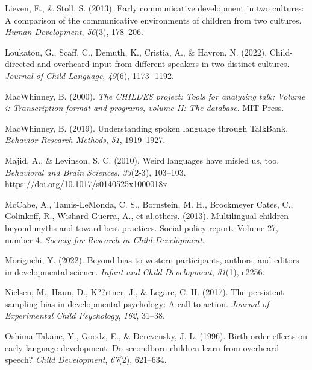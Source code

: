 \documentclass[
  man,floatsintext]{apa6}
\newlength{\cslhangindent}
\newlength{\cslentryspacingunit} %
\newenvironment{CSLReferences}[2] %
 {%
  \setlength{\parindent}{0pt}
  \ifodd #1
  \let\oldpar\par
  \def\par{\hangindent=\cslhangindent\oldpar}
  \fi
  \setlength{\parskip}{#2\cslentryspacingunit}
 }%
 {}
\begin{document}
\begin{CSLReferences}{1}{0}
\leavevmode{}%
Lieven, E., \& Stoll, S. (2013). Early communicative development in two cultures: A comparison of the communicative environments of children from two cultures. \emph{Human Development}, \emph{56}(3), 178--206.

\leavevmode{}%
Loukatou, G., Scaff, C., Demuth, K., Cristia, A., \& Havron, N. (2022). Child-directed and overheard input from different speakers in two distinct cultures. \emph{Journal of Child Language}, \emph{49}(6), 1173-\/-1192.

\leavevmode{}%
MacWhinney, B. (2000). \emph{The CHILDES project: Tools for analyzing talk: Volume i: Transcription format and programs, volume II: The database}. MIT Press.

\leavevmode{}%
MacWhinney, B. (2019). Understanding spoken language through TalkBank. \emph{Behavior Research Methods}, \emph{51}, 1919--1927.

\leavevmode{}%
Majid, A., \& Levinson, S. C. (2010). Weird languages have misled us, too. \emph{Behavioral and Brain Sciences}, \emph{33}(2-3), 103--103. \url{https://doi.org/10.1017/s0140525x1000018x}

\leavevmode{}%
McCabe, A., Tamis-LeMonda, C. S., Bornstein, M. H., Brockmeyer Cates, C., Golinkoff, R., Wishard Guerra, A., et al.others. (2013). Multilingual children beyond myths and toward best practices. Social policy report. Volume 27, number 4. \emph{Society for Research in Child Development}.

\leavevmode{}%
Moriguchi, Y. (2022). Beyond bias to western participants, authors, and editors in developmental science. \emph{Infant and Child Development}, \emph{31}(1), e2256.

\leavevmode{}%
Nielsen, M., Haun, D., K??rtner, J., \& Legare, C. H. (2017). The persistent sampling bias in developmental psychology: A call to action. \emph{Journal of Experimental Child Psychology}, \emph{162}, 31--38.

\leavevmode{}%
Oshima-Takane, Y., Goodz, E., \& Derevensky, J. L. (1996). Birth order effects on early language development: Do secondborn children learn from overheard speech? \emph{Child Development}, \emph{67}(2), 621--634.


\end{CSLReferences}
\end{document}
